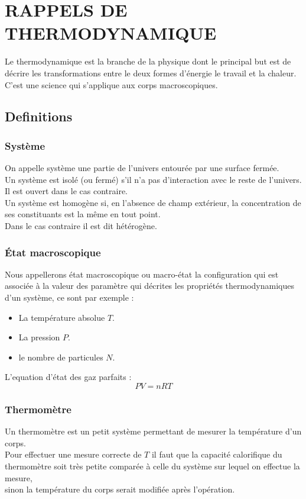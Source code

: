 \documentclass[12pt,oneside]{book}
\begin{document}




\chapter{RAPPELS DE THERMODYNAMIQUE}
Le thermodynamique est la branche de la physique dont le principal but est de décrire les transformations entre le deux formes d'énergie le travail et la chaleur. C'est une science qui s'applique aux corps macroscopiques.
\section{Definitions}
\subsection{Système}
On appelle système une partie de l'univers entourée par une surface fermée.\\
Un système est isolé (ou fermé) s'il n'a pas d'interaction avec le reste de l'univers.\\
Il est ouvert dans le cas contraire.\\

Un système est homogène si, en l'absence de champ extérieur, la concentration de ses constituants est la même en tout point.\\
Dans le cas contraire il est dit hétérogène.
\subsection{État macroscopique}
Nous appellerons état macroscopique ou macro-état la configuration qui est associée à la valeur des paramètre qui décrites les propriétés thermodynamiques d'un système, ce sont par exemple :
\begin{itemize}
	\item La température absolue $T$.
	\item La pression $P$.
	\item le nombre de particules $N$.
\end{itemize}
L'equation d'état des gaz parfaits :
\[PV = nRT\]
\subsection{Thermomètre}
Un thermomètre est un petit système permettant de mesurer la température d'un corps.\\
Pour effectuer une mesure correcte de $T$ il faut que la capacité calorifique du thermomètre soit très petite comparée à celle du système sur lequel on effectue la mesure,\\
sinon la température du corps serait modifiée après l'opération.\\
\end{document}
